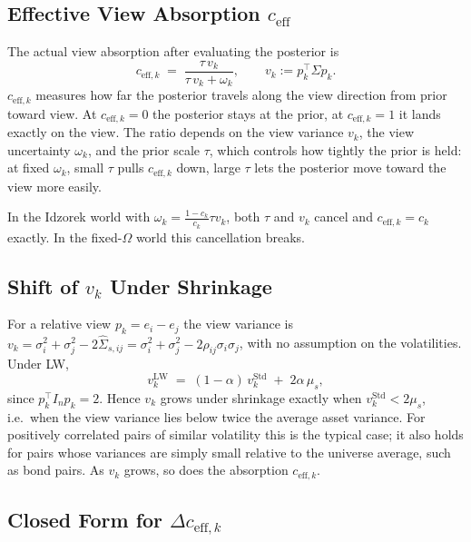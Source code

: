 \documentclass[a4paper,11pt]{article}
\theoremstyle{plain}
\theoremstyle{definition}
\newcommand{\Std}{\mathrm{Std}}
\newcommand{\LW}{\mathrm{LW}}
\newcommand{\eff}{\mathrm{eff}}
\begin{document}
\subsection{Effective View Absorption $c_{\eff}$}
\label{sec:ceff}

The actual view absorption after evaluating the posterior is
\[
  c_{\eff,k} \;=\; \frac{\tau\,v_k}{\tau\,v_k + \omega_k},
  \qquad v_k := p_k^\top\Sigma p_k.
\]
$c_{\eff,k}$ measures how far the posterior travels along the view
direction from prior toward view. At $c_{\eff,k} = 0$ the posterior
stays at the prior, at $c_{\eff,k} = 1$ it lands exactly on the view.
The ratio depends on the view variance $v_k$, the view uncertainty
$\omega_k$, and the prior scale $\tau$, which controls how tightly the
prior is held: at fixed $\omega_k$, small $\tau$ pulls $c_{\eff,k}$
down, large $\tau$ lets the posterior move toward the view more easily.

In the Idzorek world with $\omega_k = \tfrac{1-c_k}{c_k}\tau v_k$, both
$\tau$ and $v_k$ cancel and $c_{\eff,k} = c_k$ exactly. In the
fixed-$\Omega$ world this cancellation breaks.

\subsection{Shift of $v_k$ Under Shrinkage}
\label{sec:vk-shift}

For a relative view $p_k = e_i - e_j$ the view variance is
$v_k = \sigma_i^2 + \sigma_j^2 - 2\hat\Sigma_{s,ij}
     = \sigma_i^2 + \sigma_j^2 - 2\rho_{ij}\sigma_i\sigma_j$,
with no assumption on the volatilities. Under LW,
\[
  v_k^{\LW} \;=\; (1 - \alpha)\,v_k^\Std \;+\; 2\alpha\,\mu_s,
\]
since $p_k^\top I_n p_k = 2$. Hence $v_k$ grows under shrinkage exactly
when $v_k^\Std < 2\mu_s$, i.e.\ when the view variance lies below twice
the average asset variance. For positively correlated pairs of similar
volatility this is the typical case; it also holds for pairs whose
variances are simply small relative to the universe average, such as
bond pairs. As $v_k$ grows, so does the absorption $c_{\eff,k}$.

\subsection{Closed Form for $\Delta c_{\eff,k}$}
\label{sec:dceff}
\end{document}
